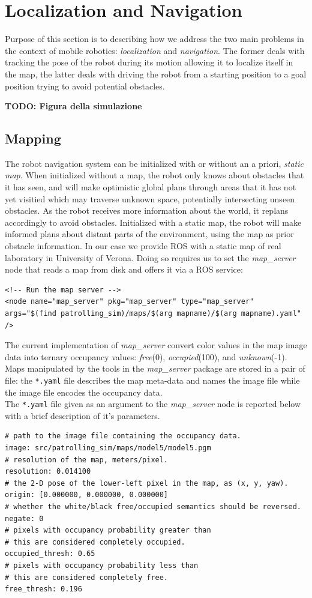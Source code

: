 
\section{Localization and Navigation}
Purpose of this section is to describing how we address the two main problems in
the context of mobile robotics: \textit{localization} and \textit{navigation}.
The former deals with tracking the pose of the robot during its motion allowing
it to localize itself in the map, the latter deals with driving the robot from a 
starting position to a goal position trying to avoid potential obstacles.

{\bf TODO: Figura della simulazione}
\newpage
\subsection{Mapping}
The robot navigation system can be initialized with or without an a priori, \textit{static map}.
When initialized without a map, the robot only knows about obstacles that it has seen,
and will make optimistic global plans through areas that it has not yet visitied
which may traverse unknown space, potentially intersecting unseen obstacles. 
As the robot receives more information about the world, it replans accordingly to
avoid obstacles. Initialized with a static map, the robot will make informed plans 
about distant parts of the environment, using the map as prior obstacle information.
In our case we provide ROS with a static map of real laboratory in University of Verona.
Doing so requires us to set the \textit{map\_server} node that reads a map from 
disk and offers it via a ROS service:
\begin{lstlisting}
<!-- Run the map server -->
<node name="map_server" pkg="map_server" type="map_server" 
args="$(find patrolling_sim)/maps/$(arg mapname)/$(arg mapname).yaml" />
\end{lstlisting}
The current implementation of \textit{map\_server} convert color values in the map 
image data into ternary occupancy values: \textit{free}(0), \textit{occupied}(100), and
\textit{unknown}(-1).
\\
Maps manipulated by the tools in the \textit{map\_server} package are stored in a 
pair of file: the \texttt{*.yaml} file describes the map meta-data and names the image 
file while the image file encodes the occupancy data.
\\
The \texttt{*.yaml} file given as an argument to the \textit{map\_server} node is reported
below with a brief description of it's parameters.
\begin{lstlisting}
# path to the image file containing the occupancy data.
image: src/patrolling_sim/maps/model5/model5.pgm
# resolution of the map, meters/pixel.
resolution: 0.014100
# the 2-D pose of the lower-left pixel in the map, as (x, y, yaw).
origin: [0.000000, 0.000000, 0.000000]
# whether the white/black free/occupied semantics should be reversed.
negate: 0
# pixels with occupancy probability greater than 
# this are considered completely occupied.
occupied_thresh: 0.65
# pixels with occupancy probability less than 
# this are considered completely free.
free_thresh: 0.196
\end{lstlisting}


